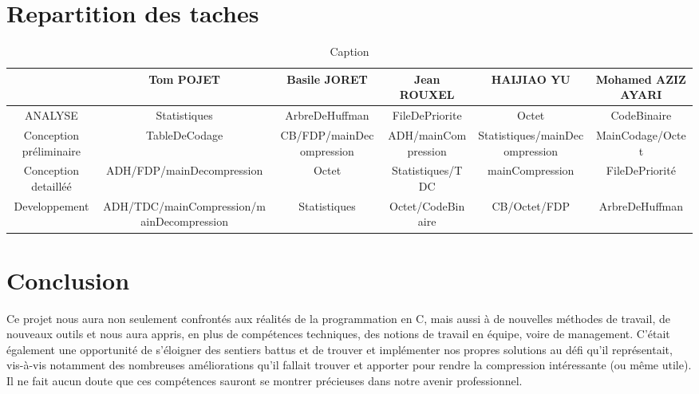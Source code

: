 \documentclass{article}
\begin{document}
\section{Repartition des taches}
\begin{table}
    \centering
    \begin{tabular}{|c|c|c|c|c|c|} \hline 
		&  Tom POJET&  Basile JORET&  Jean ROUXEL&  HAIJIAO YU& Mohamed AZIZ AYARI\\ \hline 
		ANALYSE&  Statistiques&  ArbreDeHuffman\TableDeCodage&  FileDePriorite&  Octet& CodeBinaire\\ \hline 
		Conception préliminaire& TableDeCodage & CB/FDP/mainDecompression & ADH/mainCompression & Statistiques/mainDecompression & MainCodage/Octet\\ \hline 
		Conception detailléé& ADH/FDP/mainDecompression & Octet & Statistiques/TDC & mainCompression & FileDePriorité\\ \hline 
		Developpement& ADH/TDC/mainCompression/mainDecompression & Statistiques & Octet/CodeBinaire & CB/Octet/FDP & ArbreDeHuffman \mainDEcompression\\ \hline
   \end{tabular}
    \caption{Caption}
    \label{tab:my_label}
\end{table}
\section{Conclusion}
Ce projet nous aura non seulement confrontés aux réalités de la programmation en C, mais aussi à de nouvelles méthodes de travail, de nouveaux outils et nous aura appris, en plus de compétences techniques, des notions de travail en équipe, voire de management. C'était également une opportunité de s'éloigner des sentiers battus et de trouver et implémenter nos propres solutions au défi qu'il représentait, vis-à-vis notamment des nombreuses améliorations qu'il fallait trouver et apporter pour rendre la compression intéressante (ou même utile). Il ne fait aucun doute que ces compétences sauront se montrer précieuses dans notre avenir professionnel.
\end{document}
